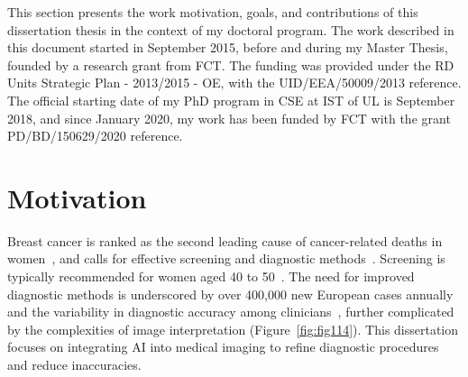 \clearpage
\label{chap:chap001}
\noindent

This section presents the work motivation, goals, and contributions of this dissertation thesis in the context of my doctoral program.
The work described in this document started in September 2015, before and during my Master Thesis, founded by a research grant from \ac{FCT}.
The funding was provided under the \ac{RD} Units Strategic Plan - 2013/2015 - \ac{OE}, with the UID/EEA/50009/2013 reference.
The official starting date of my \ac{PhD} program in \ac{CSE} at \ac{IST} of \ac{UL} is September 2018, and since January 2020, my work has been funded by \ac{FCT} with the grant PD/BD/150629/2020 reference.

\section{Motivation}
\label{sec:chap001001}

\textcolor{revised}{Breast cancer is ranked as the second leading cause of cancer-related deaths in women~\cite{doi:10.1002/cncr.32859}, and calls for effective screening and diagnostic methods~\cite{https://doi.org/10.3322/caac.21754}.
Screening is typically recommended for women aged 40 to 50~\cite{https://doi.org/10.3322/caac.21754}.
The need for improved diagnostic methods is underscored by over 400,000 new European cases annually and the variability in diagnostic accuracy among clinicians~\cite{Dafni2019}, further complicated by the complexities of image interpretation (Figure~\ref{fig:fig114}).
This dissertation focuses on integrating \ac{AI} into medical imaging to refine diagnostic procedures and reduce inaccuracies.}


